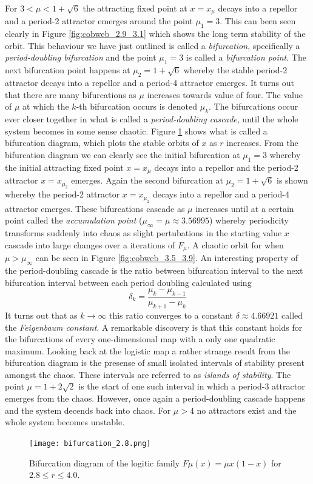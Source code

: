 \documentclass[11pt,a4paper,oneside]{memoir}
\theoremstyle{plain}
\theoremstyle{definition}
\begin{document}
For $3 < \mu < 1 + \sqrt{6}$ the attracting fixed point at $x = x_\mu$ decays into a repellor and a period-2 attractor emerges around the point $\mu_1 = 3$. This can been seen clearly in Figure \ref{fig:cobweb_2.9_3.1} which shows the long term stability of the orbit. This behaviour we have just outlined is called a \emph{bifurcation}, specifically a \emph{period-doubling bifurcation} and the point $\mu_1 = 3$ is called a \emph{bifurcation point}. The next bifurcation point happens at $\mu_2 = 1 + \sqrt{6}$ whereby the stable period-2 attractor decays into a repellor and a period-4 attractor emerges. It turns out that there are many bifurcations as $\mu$ increases towards value of four. The value of $\mu$ at which the $k$-th bifurcation occurs is denoted $\mu_k$. The bifurcations occur ever closer together in what is called a \emph{period-doubling cascade}, until the whole system becomes in some sense chaotic. Figure \ref{fig:bifurcation_2.8} shows what is called a bifurcation diagram, which plots the stable orbits of $x$ as $r$ increases. From the bifurcation diagram we can clearly see the initial bifurcation at $\mu_1 = 3$ whereby the initial attracting fixed point $x = x_\mu$ decays into a repellor and the period-2 attractor $x = x_{\mu_2}$ emerges. Again the second bifurcation at $\mu_2 = 1 + \sqrt{6}$ is shown whereby the period-2 attractor $x = x_{\mu_2}$ decays into a repellor and a period-4 attractor emerges. These bifurcations cascade as $\mu$ increases until at a certain point called the \emph{accumulation point} ($\mu_\infty = \mu \approx 3.56995$) whereby periodicity transforms suddenly into chaos as slight pertubations in the starting value $x$ cascade into large changes over a iterations of $F_\mu$. A chaotic orbit for when $\mu > \mu_\infty$ can be seen in Figure \ref{fig:cobweb_3.5_3.9}. An interesting property of the period-doubling cascade is the ratio between bifurcation interval to the next bifurcation interval between each period doubling calculated using \[\delta_k  = \frac{\mu_k - \mu_{k-1}}{\mu_{k+1}-\mu_k}\]It turns out that as $k \to \infty$ this ratio converges to a constant $\delta \approx 4.66921$ called the \emph{Feigenbaum constant}. A remarkable discovery is that this constant holds for the bifurcations of every one-dimensional map with a only one quadratic maximum. Looking back at the logistic map a rather strange result from the bifurcation diagram is the presense of small isolated intervals of stability present amongst the chaos. These intervals are referred to as \emph{islands of stability}. The point $\mu = 1 + 2\sqrt{2}$ is the start of one such interval in which a period-3 attractor emerges from the chaos. However, once again a period-doubling cascade happens and the system decends back into chaos. For $\mu > 4$ no attractors exist and the whole system becomes unstable.
\begin{figure}[h]
    \centering
    \texttt{[image: bifurcation\_2.8.png]}
    \caption{Bifurcation diagram of the logitic family $F{\mu}(x) = \mu x(1-x)$ for $2.8 \leq r \leq 4.0$.}
    \label{fig:bifurcation_2.8}
\end{figure}
\end{document}
